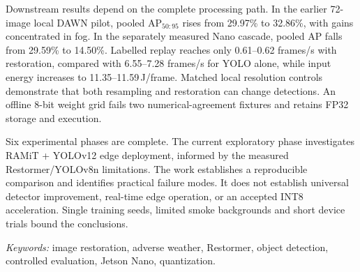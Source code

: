 Downstream results depend on the complete processing path. In the earlier
72-image local DAWN pilot, pooled AP$_{50:95}$ rises from 29.97\% to 32.86\%,
with gains concentrated in fog. In the separately measured Nano cascade,
pooled AP falls from 29.59\% to 14.50\%. Labelled replay reaches only
0.61--0.62 frames/s with restoration, compared with 6.55--7.28 frames/s for
YOLO alone, while input energy increases to 11.35--11.59\,J/frame. Matched local
resolution controls demonstrate that both resampling and restoration can
change detections. An offline 8-bit weight grid fails two numerical-agreement
fixtures and retains FP32 storage and execution.

Six experimental phases are complete. The current exploratory phase investigates
RAMiT + YOLOv12 edge deployment, informed by the measured Restormer/YOLOv8n
limitations. The work establishes a reproducible comparison and identifies practical
failure modes. It does not establish universal detector improvement,
real-time edge operation, or an accepted INT8 acceleration. Single training
seeds, limited smoke backgrounds and short device trials bound the conclusions.

\textit{Keywords:} image restoration, adverse weather, Restormer, object
detection, controlled evaluation, Jetson Nano, quantization.
\begingroup
\setlength{\parskip}{0pt}
\tableofcontents
\endgroup
\clearpage
